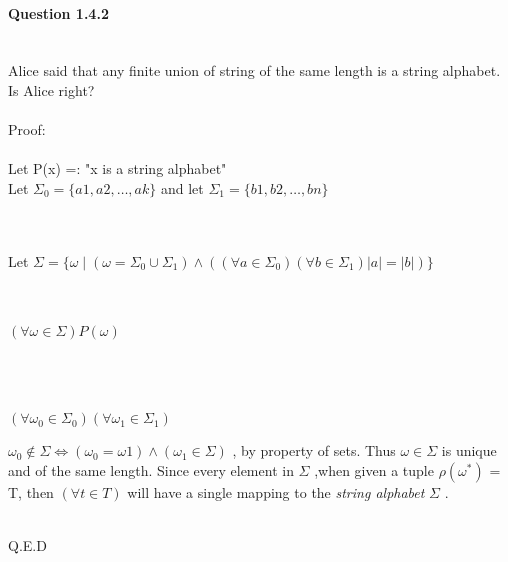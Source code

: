 \documentclass{report}
\newcommand{\me}[1]{
\begin{math}
#1
\end{math}
}
\begin{document}
\paragraph{\Large{Question 1.4.2\\ \\}}
Alice said that any finite union of string of the same length is a string alphabet. Is Alice right?
\\ \\
Proof: \\\\
Let P(x) =: "x is a string alphabet"\\
Let \me{\Sigma_0 = \{ a1,a2,\dots,ak\}} and let  \me{\Sigma_1 = \{ b1,b2,\dots,bn\}} 
\\ \\
Let \me{\Sigma = \{ \omega \mid (\omega = \Sigma_0 \cup \Sigma_1) \land ((\forall a \in \Sigma_0)(\forall b \in \Sigma_1 )|a| = |b|) \}}
\\ 
\\
\me{(\forall \omega \in \Sigma)P(\omega)}
\\ 
\\
\\
\me{(\forall \omega_0 \in \Sigma_0)(\forall \omega_1 \in \Sigma_1)} \me{ \omega_0 \notin \Sigma \iff (\omega_0 = \omega1) \land (\omega_1 \in \Sigma)}, by property of sets. Thus \me{\omega \in \Sigma} is unique and of the same length. Since every element in \me{\Sigma},when given a tuple \me{\rho(\omega ^*)} = T, then \me{(\forall t \in T)} will have a single mapping to the \textit{string alphabet}\me{\Sigma}.
\\
\\
\begin{flushright}
Q.E.D
\end{flushright}

\end{document}
